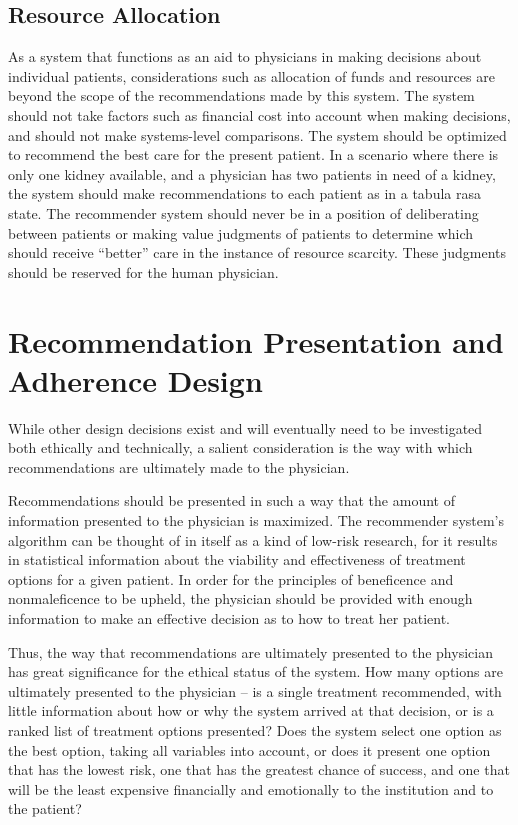 \documentclass[]{spie}  %
\begin{document}
\subsection{Resource Allocation}

As a system that functions as an aid to physicians in making decisions about individual patients, considerations such as allocation of funds and resources are beyond the scope of the recommendations made by this system. The system should not take factors such as financial cost into account when making decisions, and should not make systems-level comparisons. The system should be optimized to recommend the best care for the present patient. In a scenario where there is only one kidney available, and a physician has two patients in need of a kidney, the system should make recommendations to each patient as in a tabula rasa state. The recommender system should never be in a position of deliberating between patients or making value judgments of patients to determine which should receive “better” care in the instance of resource scarcity. These judgments should be reserved for the human physician.

\section{Recommendation Presentation and Adherence Design}

While other design decisions exist and will eventually need to be investigated both ethically and technically, a salient consideration is the way with which recommendations are ultimately made to the physician.

Recommendations should be presented in such a way that the amount of information presented to the physician is maximized. The recommender system’s algorithm can be thought of in itself as a kind of low-risk research, for it results in statistical information about the viability and effectiveness of treatment options for a given patient. In order for the principles of beneficence and nonmaleficence to be upheld, the physician should be provided with enough information to make an effective decision as to how to treat her patient.

Thus, the way that recommendations are ultimately presented to the physician has great significance for the ethical status of the system. How many options are ultimately presented to the physician -- is a single treatment recommended, with little information about how or why the system arrived at that decision, or is a ranked list of treatment options presented? Does the system select one option as the best option, taking all variables into account, or does it present one option that has the lowest risk, one that has the greatest chance of success, and one that will be the least expensive financially and emotionally to the institution and to the patient?
\end{document}
